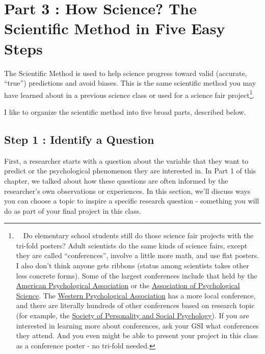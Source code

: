 \documentclass[
  letterpaper,
  DIV=11,
  numbers=noendperiod,
  oneside]{scrreprt}
\begin{document}
\section{Part 3 : How Science? The Scientific Method in Five Easy
Steps}\label{part-3-how-science-the-scientific-method-in-five-easy-steps}

The Scientific Method is used to help science progress toward valid
(accurate, ``true'') predictions and avoid biases. This is the same
scientific method you may have learned about in a previous science class
or used for a science fair project\footnote{~~Do elementary school
  students still do those science fair projects with the tri-fold
  posters? Adult scientists do the same kinds of science fairs, except
  they are called ``conferences'', involve a little more math, and use
  flat posters. I also don't think anyone gets ribbons (status among
  scientists takes other less concrete forms). Some of the largest
  conferences include that held by the
  \href{https://convention.apa.org/}{American Psychological Association}
  or the
  \href{https://www.psychologicalscience.org/conventions}{Association of
  Psychological Science}. The
  \href{https://westernpsych.org/convention/}{Western Psychological
  Association} has a more local conference, and there are literally
  hundreds of other conferences based on research topic (for example,
  the \href{http://meeting.spsp.org/}{Society of Personality and Social
  Psychology}). If you are interested in learning more about
  conferences, ask your GSI what conferences they attend. And you even
  might be able to present your project in this class as a conference
  poster - no tri-fold needed.}.

I like to organize the scientific method into five broad parts,
described below.

\subsection{Step 1 : Identify a
Question}\label{step-1-identify-a-question}

First, a researcher starts with a question about the variable that they
want to predict or the psychological phenomenon they are interested in.
In Part 1 of this chapter, we talked about how these questions are often
informed by the researcher's own observations or experiences. In this
section, we'll discuss ways you can choose a topic to inspire a specific
research question - something you will do as part of your final project
in this class.
\end{document}
